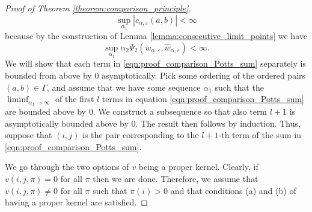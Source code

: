 \documentclass[a4paper]{article}
\numberwithin{equation}{section}
\theoremstyle{definition}
\begin{document}
\begin{proof}[Proof of Theorem \ref{theorem:comparison_principle}]
	\begin{equation} \label{eqn:bound_on_errors_c}
		\sup_{\alpha_1} \left| c_{\alpha,\varepsilon}(a,b) \right| < \infty
	\end{equation}
	because by the construction of Lemma \ref{lemma:consecutive_limit_points} we have
	\begin{equation*}
		\sup_{\alpha_1} \alpha_2 \Psi_2(w_{\alpha,\varepsilon},\hat{w}_{\alpha,\varepsilon}) < \infty.
	\end{equation*} 
	We will show that each term in \eqref{eqn:proof_comparison_Potts_sum} separately is bounded from above by $0$ asymptotically. Pick some ordering of the ordered pairs $(a,b) \in \Gamma$, and assume that we have some sequence $\alpha_1$ such that the $\liminf_{\alpha_1 \rightarrow \infty}$ of the first $l$ terms in equation \eqref{eqn:proof_comparison_Potts_sum} are bounded above by $0$. We construct a subsequence so that also term $l+1$ is asymptotically bounded above by $0$. The result then follows by induction.
	Thus, suppose that $(i,j)$ is the pair corresponding to the $l+1$-th term of the sum in \eqref{eqn:proof_comparison_Potts_sum}. 
	
	
	We go through the two options of $v$ being a proper kernel. Clearly, if $v(i,j,\pi) = 0$ for all $\pi$ then we are done. Therefore, we assume that $v(i,j,\pi) \neq 0$ for all $\pi$ such that $\pi(i) > 0$ and that conditions (a) and (b) of having a proper kernel are satisfied.
	

\end{proof}
\end{document}
